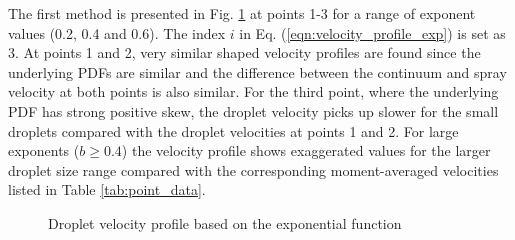 \documentclass[a4paper,10pt]{article}
\begin{document}
The first method is presented in Fig. \ref{fig:d_m1} at points 1-3 for a range of exponent values (0.2, 0.4 and 0.6).  The index $i$ in Eq. (\ref{eqn:velocity_profile_exp}) is set as $3$. At points 1 and 2, very similar shaped velocity profiles are found since the underlying PDFs are similar and the difference between the continuum and spray velocity at both points is also similar. For the third point, where the underlying PDF has strong positive skew, the droplet velocity picks up slower for the small droplets compared with the droplet velocities at points 1 and 2. For large exponents ($b\geq0.4$) the velocity profile shows exaggerated values for the larger droplet size range compared with the corresponding moment-averaged velocities listed in Table \ref{tab:point_data}.
%
\begin{figure}[H]
\centering
{}
\caption{Droplet velocity profile based on the exponential function}
\label{fig:d_m1}
\end{figure}
\end{document}
